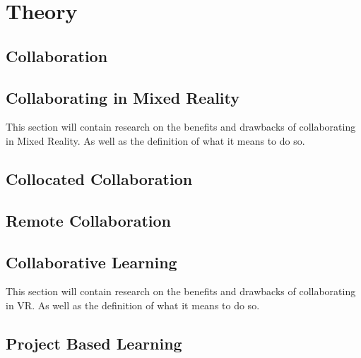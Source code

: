 \chapter{Theory}

    \section{Collaboration}

    \section{Collaborating in Mixed Reality}
    This section will contain research on the benefits and drawbacks of collaborating in Mixed Reality. As well as the definition of what it means to do so.
    
    \section{Collocated Collaboration}
    
    \section{Remote Collaboration}
    
    \section{Collaborative Learning} %
    This section will contain research on the benefits and drawbacks of collaborating in VR. As well as the definition of what it means to do so.
    
    \section{Project Based Learning}